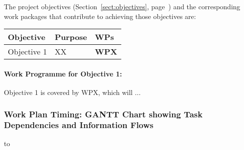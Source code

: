 \documentclass[a4paper,11pt]{article}
\begin{document}
The project objectives (Section~\ref{sect:objectives},
page~\pageref{sect:objectives}) and the corresponding work
packages that contribute to achieving those objectives are:

\begin{center}
\begin{tabular}{|l|l|l|}\hline
\textbf{Objective} & \textbf{Purpose} & \textbf{WPs} \\\hline \hline
Objective 1 & XX & \textbf{WPX} \\\hline
\end{tabular}
\end{center}

\paragraph*{Work Programme for Objective 1: }

Objective 1 is covered by WPX, which will ...

\landscape

\subsubsection*{Work Plan Timing: GANTT Chart showing Task Dependencies and Information Flows}


\vspace{-0.7in} \centerline{\hbox to \columnwidth{\hss%
\hss}}
\label{fig:gantt}
\vspace{-1in} %
\endlandscape

\newpage

%


\addtocounter{subsubsection}{1}
\fbox{\begin{minipage}{\textwidth}\begin{center}{\Large\bf
        Work package list} %
  \end{center}
  \end{minipage}}

\bigskip\bigskip
\end{document}
